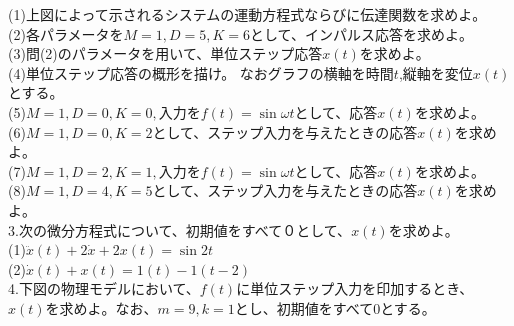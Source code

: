 \documentclass[a4paper,12pt]{article}
\begin{document}
\indent
(1)上図によって示されるシステムの運動方程式ならびに伝達関数を求めよ。\\

\indent
(2)各パラメータを\(M=1,D=5,K=6\)として、インパルス応答を求めよ。\\

\indent
(3)問(2)のパラメータを用いて、単位ステップ応答\(x(t)\)を求めよ。\\

\indent
(4)単位ステップ応答の概形を描け。
なおグラフの横軸を時間\(t\),縦軸を変位\(x(t)\)とする。\\

\indent
(5)\(M=1,D=0,K=0,\)入力を\(f(t)=\sin \omega t\)として、応答\(x(t)\)を求めよ。\\

\indent
(6)\(M=1,D=0,K=2\)として、ステップ入力を与えたときの応答\(x(t)\)を求めよ。\\

\indent
(7)\(M=1,D=2,K=1,\)入力を\(f(t)=\sin \omega t\)として、応答\(x(t)\)を求めよ。\\

\indent
(8)\(M=1,D=4,K=5\)として、ステップ入力を与えたときの応答\(x(t)\)を求めよ。\\


\noindent
3.次の微分方程式について、初期値をすべて０として、\(x(t)\)を求めよ。\\

(1)\quad \( \ddot{x}(t)+ 2\dot{x}+ 2x(t)= \sin 2t \)\\

(2)\quad \( \dot{x}(t)+ x(t)= 1(t)- 1(t-2) \)\\



\noindent
4.下図の物理モデルにおいて、\(f(t)\)に単位ステップ入力を印加するとき、
    \(x(t)\)を求めよ。なお、\(m=9,k=1\)とし、初期値をすべて\(0\)とする。
    \begin{center}
    \end{center}
\end{document}
